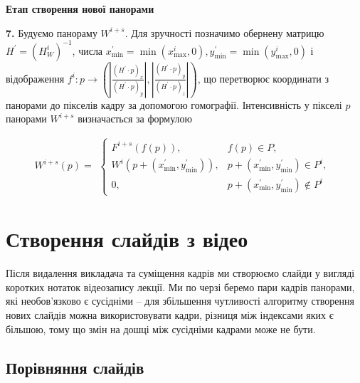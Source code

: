 \begin{algorithm}[H]
\begin{algorithmic}
        \textbf{Етап створення нової панорами}
        
        \textbf{7.}
        Будуємо панораму $W^{i+s}$. Для зручності позначимо обернену матрицю $H^{'} = (H_{W}^{i})^{-1}$, числа
        $x_{\min}^{'} = \min(x_{\max}^{i}, 0), y_{\min}^{'} = \min(y_{\max}^{i}, 0)$ і відображення
        $f^i: p \rightarrow
            (|\frac{(H^{'} \cdot p)_x}{(H^{'} \cdot p)_y}|, |\frac{(H^{'} \cdot p)_y}{(H^{'} \cdot p)_z}|)$, що перетворює
        координати з панорами до пікселів кадру за допомогою гомографії. Інтенсивність у пікселі $p$ панорами
        $W^{i+s}$ визначається за формулою

        \begin{equation}
            W^{i + s}(p) =
            \begin{gathered}
                \begin{cases}
                    F^{i + s}(f(p)),                            & f(p) \in P,                                    \\
                    W^{i}( p + ( x_{\min}^{'},y_{\min}^{'} ) ), & p + ( x_{\min}^{'},y_{\min}^{'} ) \in P^{i},   \\
                    0,                                          & p + ( x_{\min}^{'},y_{\min}^{'} ) \notin P^{i}
                \end{cases}
            \end{gathered}
        \end{equation}
    \end{algorithmic}
    \label{al:panorama_creating_algorithm}
\end{algorithm}


\section{Створення слайдів з відео}

Після видалення викладача та суміщення кадрів ми створюємо слайди у вигляді
коротких нотаток відеозапису лекції. Ми по черзі беремо пари кадрів панорами, які
необов'язково є сусідніми – для збільшення чутливості алгоритму створення нових
слайдів можна використовувати кадри, різниця між індексами яких є більшою, тому що
змін на дошці між сусідніми кадрами може не бути.


\subsection{Порівняння слайдів}


